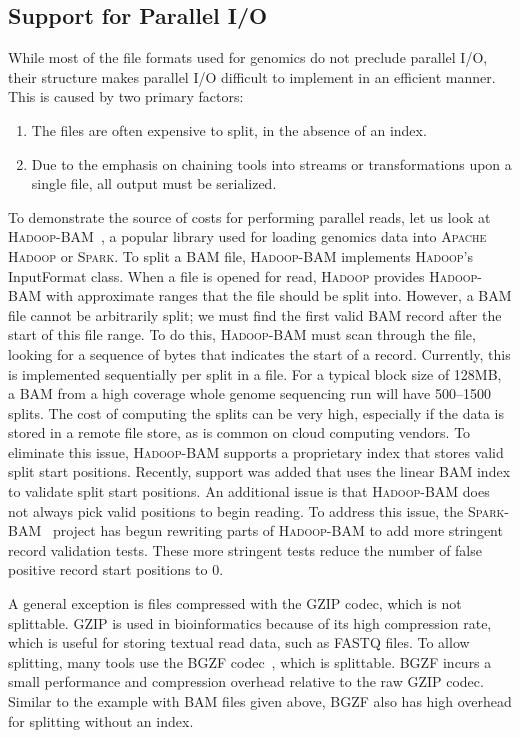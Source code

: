 \documentclass[phd]{ucbthesis}
\begin{document}
\subsection{Support for Parallel I/O}
\label{sec:parallel-io}

While most of the file formats used for genomics do not preclude parallel I/O,
their structure makes parallel I/O difficult to implement in an efficient
manner. This is caused by two primary factors:

\begin{enumerate}
\item The files are often expensive to split, in the absence of an index.
\item Due to the emphasis on chaining tools into streams or transformations upon
  a single file, all output must be serialized.
\end{enumerate}

To demonstrate the source of costs for performing parallel reads, let us look at
\textsc{Hadoop-BAM}~\cite{niemenmaa12}, a popular library used for loading
genomics data into \textsc{Apache Hadoop} or \textsc{Spark}. To split a BAM file,
\textsc{Hadoop-BAM} implements \textsc{Hadoop}'s InputFormat class. When a file
is opened for read, \textsc{Hadoop} provides \textsc{Hadoop-BAM} with approximate
ranges that the file should be split into. However, a BAM file cannot be
arbitrarily split; we must find the first valid BAM record after the start of
this file range. To do this, \textsc{Hadoop-BAM} must scan through the file,
looking for a sequence of bytes that indicates the start of a record. Currently,
this is implemented sequentially per split in a file. For a typical block size
of 128MB, a BAM from a high coverage whole genome sequencing run will have
500--1500 splits. The cost of computing the splits can be very high, especially
if the data is stored in a remote file store, as is common on cloud computing
vendors. To eliminate this issue, \textsc{Hadoop-BAM} supports a proprietary
index that stores valid split start positions. Recently, support was added that
uses the linear BAM index to validate split start positions. An additional issue
is that \textsc{Hadoop-BAM} does not always pick valid positions to begin
reading. To address this issue, the \textsc{Spark-BAM}~\cite{sparkbam} project
has begun rewriting parts of \textsc{Hadoop-BAM} to add more stringent record
validation tests. These more stringent tests reduce the number of false positive
record start positions to 0.

A general exception is files compressed with the GZIP codec, which is not
splittable. GZIP is used in bioinformatics because of its high compression rate,
which is useful for storing textual read data, such as FASTQ files. To allow
splitting, many tools use the BGZF codec~\cite{li11tabix}, which is splittable.
BGZF incurs a small performance and compression overhead relative to the raw
GZIP codec. Similar to the example with BAM files given above, BGZF also has
high overhead for splitting without an index.
\end{document}
